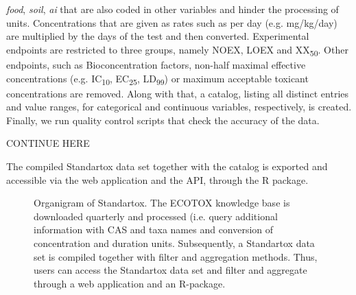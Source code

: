 \documentclass[journal,datadescriptor,submit,moreauthors,pdftex]{Definitions/mdpi}
\begin{document}
\textit{food}, \textit{soil}, \textit{ai} that are also coded in other variables and hinder the processing of units. Concentrations that are given as rates such as per day (e.g. mg/kg/day) are multiplied by the days of the test and then converted. Experimental endpoints are restricted to three groups, namely NOEX, LOEX and XX\textsubscript{50}. Other endpoints, such as Bioconcentration factors, non-half maximal effective concentrations (e.g. IC\textsubscript{10}, EC\textsubscript{25}, LD\textsubscript{99}) or maximum acceptable toxicant concentrations are removed. Along with that, a catalog, listing all distinct entries and value ranges, for categorical and continuous variables, respectively, is created. Finally, we run quality control scripts that check the accuracy of the data.

CONTINUE HERE

The compiled Standartox data set together with the catalog is exported and accessible via the web application and the API, through the R package.

\begin{figure}[H]
    \centering
    
    \caption{Organigram of Standartox. The ECOTOX knowledge base is downloaded quarterly and processed (i.e. query additional information with CAS and taxa names and conversion of concentration and duration units. Subsequently, a Standartox data set is compiled together with filter and aggregation methods. Thus, users can access the Standartox data set and filter and aggregate through a web application and an R-package.}
    \label{fig:stx-organigram}
\end{figure}
\end{document}
